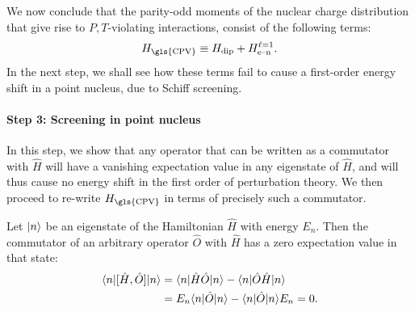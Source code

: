 We now conclude that the parity-odd moments of the nuclear charge distribution
that give rise to $P,T$-violating interactions, consist of the following terms:
%
\begin{equation}
    \label{HCPV}
   H_\text{\gls{CPV}}\equiv
H_\text{dip}+H_\text{e--n}^{\ell=1}.
\end{equation}
%
In the next step, we shall see how these terms fail to cause a first-order
energy shift in a point nucleus, due to Schiff screening.

\paragraph{Step 3: Screening in point nucleus}

In this step, we show that any operator that can be written as a commutator with
$\hat H$ will have a vanishing expectation value in any eigenstate of $\hat H$,
and will thus cause no energy shift in the first order of perturbation theory.
We then proceed to re-write $H_\text{\gls{CPV}}$ in terms of precisely such a
commutator.

Let $|n\rangle$ be an eigenstate of the Hamiltonian $\hat H$ with energy $E_n$.
Then the commutator of an arbitrary operator $\hat O$ with $\hat H$ has a zero
expectation value in that state:
%
\begin{align*}
    \langle n|[\hat H,\hat O]|n\rangle
    &=\langle n|\hat H\hat O|n\rangle-\langle n|\hat O\hat H|n\rangle\\
    &=E_n\langle n|\hat O|n\rangle-\langle n|\hat O|n\rangle E_n
    =0.
\end{align*}

